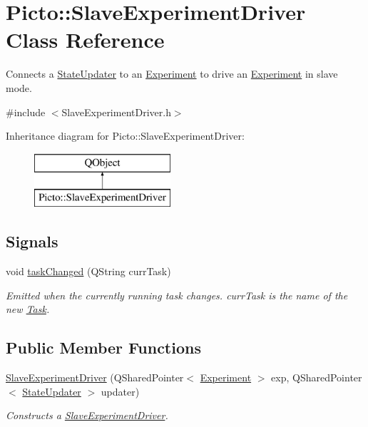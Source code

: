 \hypertarget{class_picto_1_1_slave_experiment_driver}{\section{Picto\-:\-:Slave\-Experiment\-Driver Class Reference}
\label{class_picto_1_1_slave_experiment_driver}
}


Connects a \hyperlink{class_picto_1_1_state_updater}{State\-Updater} to an \hyperlink{class_picto_1_1_experiment}{Experiment} to drive an \hyperlink{class_picto_1_1_experiment}{Experiment} in slave mode.  




{\ttfamily \#include $<$Slave\-Experiment\-Driver.\-h$>$}

Inheritance diagram for Picto\-:\-:Slave\-Experiment\-Driver\-:\begin{figure}[H]
\begin{center}
\leavevmode
\includegraphics[height=2.000000cm]{class_picto_1_1_slave_experiment_driver}
\end{center}
\end{figure}
\subsection*{Signals}
\begin{DoxyCompactItemize}
\item 
void \hyperlink{class_picto_1_1_slave_experiment_driver_a9a9bf3a5ed00d009eb31019315a7b5a1}{task\-Changed} (Q\-String curr\-Task)
\begin{DoxyCompactList}\small\item\em Emitted when the currently running task changes. curr\-Task is the name of the new \hyperlink{class_picto_1_1_task}{Task}. \end{DoxyCompactList}\end{DoxyCompactItemize}
\subsection*{Public Member Functions}
\begin{DoxyCompactItemize}
\item 
\hyperlink{class_picto_1_1_slave_experiment_driver_ab73c6ba9a23dd3a15b7fe5300e2f32c6}{Slave\-Experiment\-Driver} (Q\-Shared\-Pointer$<$ \hyperlink{class_picto_1_1_experiment}{Experiment} $>$ exp, Q\-Shared\-Pointer$<$ \hyperlink{class_picto_1_1_state_updater}{State\-Updater} $>$ updater)
\begin{DoxyCompactList}\small\item\em Constructs a \hyperlink{class_picto_1_1_slave_experiment_driver}{Slave\-Experiment\-Driver}. \end{DoxyCompactList}\end{DoxyCompactItemize}


